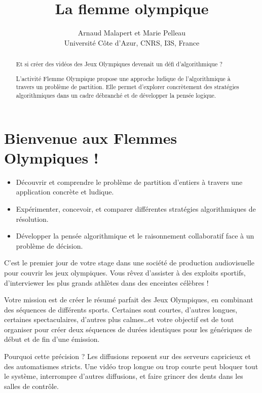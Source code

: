 \documentclass[a4paper,twoside]{article}
\title{La flemme olympique}
\author{Arnaud Malapert et Marie Pelleau \\
Université Côte d'Azur, CNRS, I3S, France
}
\date{}
\begin{document}
\mymaketitle


\thispagestyle{empty}
\begin{abstract}
  \noindent Et si créer des vidéos des Jeux Olympiques devenait un défi d'algorithmique ?

  \noindent L'activité Flemme Olympique propose une approche ludique de l'algorithmique à travers un problème de partition.
  Elle permet d'explorer concrètement des stratégies algorithmiques dans un cadre débranché et de développer la pensée logique.
\end{abstract}


\renewcommand{\baselinestretch}{0.75}\normalsize
\tableofcontents
\renewcommand{\baselinestretch}{1.0}\normalsize

\ifleaflet
  \cleardoublepage
  \setcounter{page}{1}
\else
  \clearpage
\fi



\section{Bienvenue aux Flemmes Olympiques !}
\label{sec:flemo}


\begin{objectifs}
  \begin{itemize}
  \item Découvrir et comprendre le problème de partition d'entiers à travers une application concrète et ludique.
  \item Expérimenter, concevoir, et comparer différentes stratégies algorithmiques de résolution.
  \item Développer la pensée algorithmique et le raisonnement collaboratif face à un problème de décision.
  \end{itemize}
\end{objectifs}


C'est le premier jour de votre stage dans une société de production audiovisuelle pour couvrir les jeux olympiques.
Vous rêvez d'assister à des exploits sportifs, d'interviewer les plus grands athlètes dans des enceintes célèbres !

Votre mission est de créer le résumé parfait des Jeux Olympiques, en combinant des séquences de différents sports.
 Certaines sont courtes, d'autres longues, certaines spectaculaires, d'autres plus calmes\dots et votre objectif est de tout organiser pour créer deux séquences de durées identiques pour les génériques de début et de fin d'une émission.

Pourquoi cette précision ?
Les diffusions reposent sur des serveurs capricieux et des automatismes stricts.
Une vidéo trop longue ou trop courte peut bloquer tout le système, interrompre d'autres diffusions, et faire grincer des dents dans les salles de contrôle.
\end{document}
